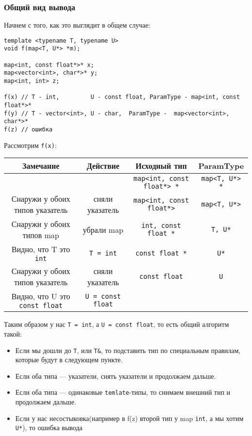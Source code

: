 		\subsubsection{Общий вид вывода}
		Начнем с того, как это выглядит в общем случае:
\begin{verbatim}
template <typename T, typename U>
void f(map<T, U*> *m);

map<int, const float*>* x;
map<vector<int>, char*>* y;
map<int, int> z;

f(x) // T - int,         U - const float, ParamType - map<int, const float*>*
f(y) // T - vector<int>, U - char,  ParamType -  map<vector<int>, char*>*
f(z) // ошибка
\end{verbatim}
		Рассмотрим \texttt{f(x)}:
		\begin {center}
		\begin {tabular} { |c|c|c|c| }
		\hline
			Замечание & Действие & Исходный тип & ParamType \\
		\hline
			& & \texttt{map<int, const float*> *} & \texttt{map<T, U*> *} \\
		\hline
			Снаружи у обоих типов указатель & сняли указатель & \texttt{map<int, const float*>} & \texttt{map<T, U*>} \\
		\hline
			Снаружи у обоих типов map & убрали map & \texttt{int, const float *} & \texttt{T, U*} \\
		\hline	
			Видно, что T это \texttt{int} & \texttt{T = int} & \texttt{const float *} & \texttt{U*} \\
		\hline
			Снаружи у обоих типов указатель & сняли указатель & \texttt{const float} & \texttt{U} \\
		\hline
			Видно, что U это \texttt{const float} & \texttt{U = const float} & & \\
		\hline	
		\end {tabular}
		\end {center}
		Таким образом у нас \texttt{T = int}, а \texttt{U = const float}, то есть общий алгоритм такой:
		\begin {itemize}
			\item Если мы дошли до \texttt{T}, или \texttt{T&}, то подставить тип по специальным правилам, которые будут в следующем пункте.
			\item Если оба типа --- указатели, снять указатели и продолжаем дальше.
			\item Если оба типа --- одинаковые \texttt{temlate}-типы, то снимаем внешний тип и продолжаем дальше.
			\item Если у нас несостыковка(например в f(z) второй тип у map \texttt{int}, а мы хотим \texttt{U*}), то ошибка вывода
		\end {itemize}
